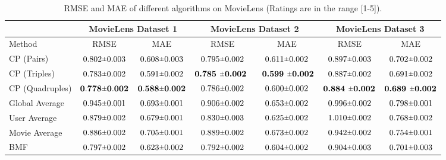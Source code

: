 \documentclass[journal]{IEEEtran}
\newcommand{\rpm}{\raisebox{.2ex}{$\scriptstyle\pm$}}
\begin{document}
\begin{table*}[!ht]
\begin{center}
\caption{RMSE and MAE of different algorithms on MovieLens (Ratings are in the range [1-5]).}
\label{table:regression}
\begin{tabular}{ l|  c  c | c c | c c }
\hline
&  \multicolumn{2}{c}{\textbf{MovieLens Dataset 1}}            &  \multicolumn{2}{c}{\textbf{MovieLens Dataset 2}}     &  \multicolumn{2}{c}{\textbf{MovieLens Dataset 3}} \\
\hline
 Method &  RMSE       & 	MAE     &  RMSE      			& MAE  &  RMSE      & MAE \\
\hline
 CP (Pairs)      & $ 0.802 \rpm 0.003 $   & 	$0.608 \rpm 0.003 $   	&  $0.795 \rpm 0.002 $ 	& $0.611 \rpm 0.002$  &  $ 0.897 \rpm 0.003$ & $0.702 \rpm 0.002 $ \\
 CP (Triples)    & $0.783 \rpm 0.002 $  & 	$0.591 \rpm 0.002$   	&  $\textbf{0.785 \rpm 0.002 }$  & $\textbf{ 0.599 \rpm  0.002}$  &  $ 0.887 \rpm 0.002 $ & $ 0.691 \rpm 0.002$  \\
 CP (Quadruples) & $\mathbf{0.778 \rpm 0.002}$    & 	$\mathbf{0.588 \rpm 0.002}$   &  $ 0.786 \rpm 0.002$ & $ 0.600 \rpm 0.002 $  &  $\textbf{0.884 \rpm 0.002}$       & $ \textbf{0.689 \rpm 0.002}$  \\
\hline
 Global Average   & $ 0.945 \rpm 0.001 $ & 	$0.693 \rpm 0.001 $     &  $ 0.906 \rpm 0.002$      & $ 0.653 \rpm 0.002 $ &  $0.996 \rpm 0.002 $   & $0.798 \rpm 0.001 $  \\
 User  Average    & $0.879 \rpm  0.002 $ & 	$ 0.679 \rpm 0.001$     &  $ 0.830 \rpm 0.003 $      & $ 0.625\rpm 0.002 $ &  $1.010 \rpm 0.002 $   & $ 0.768 \rpm 0.002$  \\
 Movie Average  	  & $0.886 \rpm 0.002$ & 	$0.705 \rpm 0.001 $  	&  $0.889 \rpm 0.002 $      & $ 0.673 \rpm 0.002$ &  $ 0.942 \rpm 0.002 $   & $ 0.754 \rpm 0.001$  \\
 BMF & $0.797 \rpm 0.002$ & 	$ 0.623 \rpm 0.002 $   	&  $ 0.792 \rpm 0.002 $ & $ 0.604 \rpm 0.002 $ &  $0.904 \rpm 0.003$   & $0.701 \rpm 0.003 $        \\
\hline
\end{tabular}
\end{center}
\end{table*}
\end{document}
